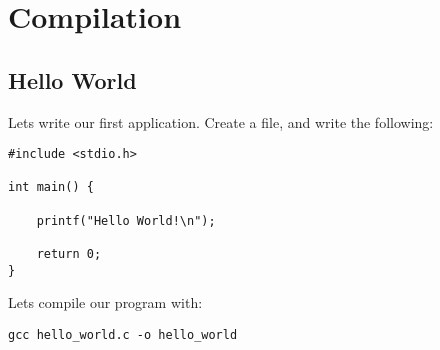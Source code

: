 \section{Compilation}

\subsection{Hello World}
Lets write our first application. Create a  file, and write the following:

\begin{lstlisting}[style=CStyle,caption={hello_world.c}]
#include <stdio.h>

int main() {

    printf("Hello World!\n");

    return 0;
}

\end{lstlisting}

Lets compile our program with:
\begin{lstlisting}[style=CStyle,caption={hello_world.c}]
gcc hello_world.c -o hello_world

\end{lstlisting}
